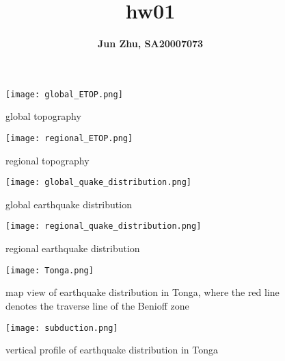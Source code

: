 \documentclass{article}
\title{\textbf{hw01}}
\author{\textbf{Jun Zhu, SA20007073}}
\begin{document}
\maketitle
\begin{figure}[H]
\centering
\texttt{[image: global\_ETOP.png]}
\caption{global topography}
\end{figure}
\begin{figure}[H]
\centering
\texttt{[image: regional\_ETOP.png]}
\caption{regional topography}
\end{figure}
\begin{figure}[H]
\centering
\texttt{[image: global\_quake\_distribution.png]}
\caption{global earthquake distribution}
\end{figure}
\begin{figure}[H] 
\centering
\texttt{[image: regional\_quake\_distribution.png]}
\caption{regional earthquake distribution}
\end{figure}
\begin{figure}[H]
\centering
\texttt{[image: Tonga.png]}
\caption{map view of earthquake distribution in Tonga, where the red line denotes the traverse line of the Benioff zone}
\end{figure}
\begin{figure}[H]
\centering
\texttt{[image: subduction.png]}
\caption{vertical profile of earthquake distribution in Tonga}
\end{figure}
\end{document}
